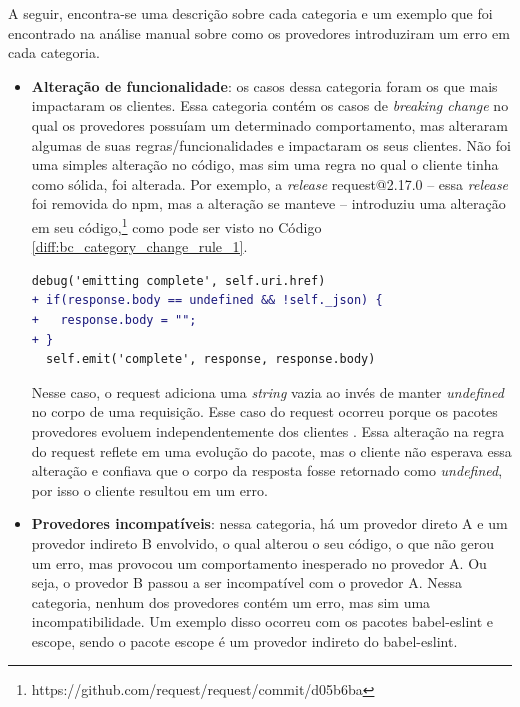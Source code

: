 A seguir, encontra-se uma descrição sobre cada categoria e um exemplo que foi encontrado na análise manual sobre como os provedores introduziram um erro em cada categoria.

\begin{itemize}
    \item \textbf{Alteração de funcionalidade}: os casos dessa categoria foram os que mais impactaram os clientes. Essa categoria contém os casos de \textit{breaking change} no qual os provedores possuíam um determinado comportamento, mas alteraram algumas de suas regras/funcionalidades e impactaram os seus clientes. Não foi uma simples alteração no código, mas sim uma regra no qual o cliente tinha como sólida, foi alterada. Por exemplo, a \textit{release} \textsf{request@2.17.0} -- essa \textit{release} foi removida do \textsf{npm}, mas a alteração se manteve -- introduziu uma alteração em seu código,\footnote{https://github.com/request/request/commit/d05b6ba} como pode ser visto no Código \ref{diff:bc_category_change_rule_1}.

    \begin{lstlisting}[numbers=none, language=diff, label=diff:bc_category_change_rule_1, caption={Exemplo da categoria \textit{Alteração de funcionalidade}}]
  debug('emitting complete', self.uri.href)
+ if(response.body == undefined && !self._json) {
+   response.body = "";
+ }
  self.emit('complete', response, response.body)
    \end{lstlisting}

    Nesse caso, o \textsf{request} adiciona uma \textit{string} vazia ao invés de manter \textit{undefined} no corpo de uma requisição. Esse caso do \textsf{request} ocorreu porque os pacotes provedores evoluem independentemente dos clientes \cite{Foo:2018:ESC:3236024.3275535}. Essa alteração na regra do \textsf{request} reflete em uma evolução do pacote, mas o cliente não esperava essa alteração e confiava que o corpo da resposta fosse retornado como \textit{undefined}, por isso o cliente resultou em um erro.

    \item \textbf{Provedores incompatíveis}: nessa categoria, há um provedor direto \textsf{A} e um provedor indireto \textsf{B} envolvido, o qual alterou o seu código, o que não gerou um erro, mas provocou um comportamento inesperado no provedor \textsf{A}. Ou seja, o provedor \textsf{B} passou a ser incompatível com o provedor \textsf{A}. Nessa categoria, nenhum dos provedores contém um erro, mas sim uma incompatibilidade. Um exemplo disso ocorreu com os pacotes \textsf{babel-eslint} e \textsf{escope}, sendo o pacote \textsf{escope} é um provedor indireto do \textsf{babel-eslint}.


\end{itemize}
